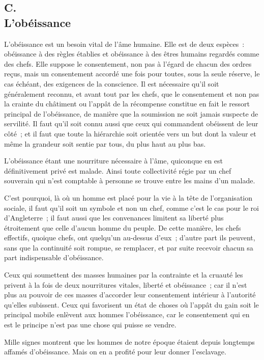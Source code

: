 \documentclass[french,twoside]{book} %
\begin{document}
\subsection[{C. L’obéissance}]{C. \\
L’obéissance}
\noindent \par
L'obéissance est un besoin vital de l'âme humaine. Elle est de deux espèces : obéissance à des règles établies et obéissance à des êtres humains regardés comme des chefs. Elle suppose le consentement, non pas à l'égard de chacun des ordres reçus, mais un consentement accordé une fois pour toutes, sous la seule réserve, le cas échéant, des exigences de la conscience. Il est nécessaire qu'il soit généralement reconnu, et avant tout par les chefs, que le consentement et non pas la crainte du châtiment ou l'appât de la récompense constitue en fait le ressort principal de l'obéissance, de manière que la soumission ne soit jamais suspecte de servilité. Il faut qu'il soit connu aussi que ceux qui commandent obéissent de leur côté ; et il faut que toute la hiérarchie soit orientée vers un but dont la valeur et même la grandeur soit sentie par tous, du plus haut au plus bas.\par
L'obéissance étant une nourriture nécessaire à l'âme, quiconque en est définitivement privé est malade. Ainsi toute collectivité régie par un chef souverain qui n'est comptable à personne se trouve entre les mains d'un malade.\par
C'est pourquoi, là où un homme est placé pour la vie à la tête de l'organisation sociale, il faut qu'il soit un symbole et non un chef, comme c'est le cas pour le roi d'Angleterre ; il faut aussi que les convenances limitent sa liberté plus étroitement que celle d'aucun homme du peuple. De cette manière, les chefs effectifs, quoique chefs, ont quelqu'un au-dessus d'eux ; d'autre part ils peuvent, sans que la continuité soit rompue, se remplacer, et par suite recevoir chacun sa part indispensable d'obéissance.\par
Ceux qui soumettent des masses humaines par la contrainte et la cruauté les privent à la fois de deux nourritures vitales, liberté et obéissance ; car il n'est plus au pouvoir de ces masses d'accorder leur consentement intérieur à l'autorité qu'elles subissent. Ceux qui favorisent un état de choses où l'appât du gain soit le principal mobile enlèvent aux hommes l'obéissance, car le consentement qui en est le principe n'est pas une chose qui puisse se vendre.\par
Mille signes montrent que les hommes de notre époque étaient depuis longtemps affamés d'obéissance. Mais on en a profité pour leur donner l'esclavage.
\end{document}
